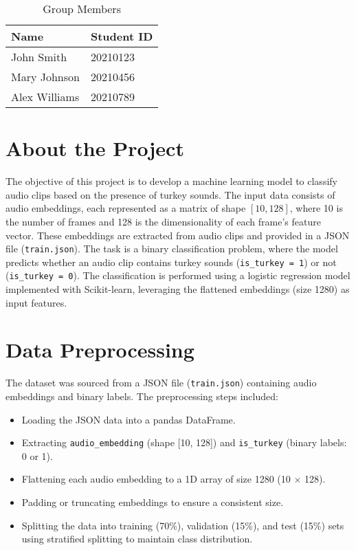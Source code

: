 \documentclass[12pt, a4paper]{article}
\begin{document}
\begin{table}[h]
    \centering
    \begin{tabular}{ll}
        \toprule
        \textbf{Name} & \textbf{Student ID} \\
        \midrule
        John Smith & 20210123 \\
        Mary Johnson & 20210456 \\
        Alex Williams & 20210789 \\
        \bottomrule
    \end{tabular}
    \caption{Group Members}
    \label{tab:group_members}
\end{table}

\section{About the Project}
The objective of this project is to develop a machine learning model to classify audio clips based on the presence of turkey sounds. The input data consists of audio embeddings, each represented as a matrix of shape $[10, 128]$, where 10 is the number of frames and 128 is the dimensionality of each frame’s feature vector. These embeddings are extracted from audio clips and provided in a JSON file (\texttt{train.json}). The task is a binary classification problem, where the model predicts whether an audio clip contains turkey sounds (\texttt{is\_turkey = 1}) or not (\texttt{is\_turkey = 0}). The classification is performed using a logistic regression model implemented with Scikit-learn, leveraging the flattened embeddings (size 1280) as input features.

\section{Data Preprocessing}
The dataset was sourced from a JSON file (\texttt{train.json}) containing audio embeddings and binary labels. The preprocessing steps included:

\begin{itemize}
    \item Loading the JSON data into a pandas DataFrame.
    \item Extracting \texttt{audio\_embedding} (shape [10, 128]) and \texttt{is\_turkey} (binary labels: 0 or 1).
    \item Flattening each audio embedding to a 1D array of size 1280 (10 $\times$ 128).
    \item Padding or truncating embeddings to ensure a consistent size.
    \item Splitting the data into training (70\%), validation (15\%), and test (15\%) sets using stratified splitting to maintain class distribution.
\end{itemize}
\end{document}
